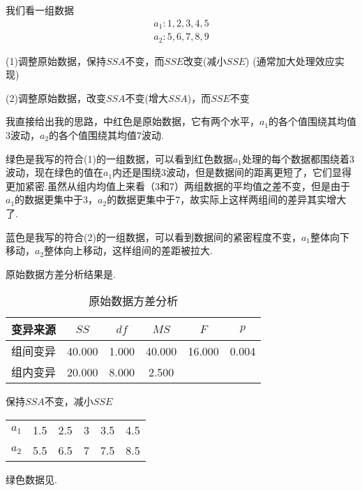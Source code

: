 我们看一组数据
\begin{align*}
    a_1:1, 2, 3, 4, 5\\
    a_2:5, 6, 7, 8, 9
\end{align*}

(1)调整原始数据，保持$SSA$不变，而$SSE$改变(减小$SSE$) (通常加大处理效应实现)

(2)调整原始数据，改变$SSA$不变(增大$SSA$)，而$SSE$不变

我直接给出我的思路，中红色是原始数据，它有两个水平，$a_1$的各个值围绕其均值3波动，$a_2$的各个值围绕其均值7波动.

绿色是我写的符合(1)的一组数据，可以看到红色数据$a_1$处理的每个数据都围绕着3波动，现在绿色的值在$a_1$内还是围绕3波动，但是数据间的距离更短了，它们显得更加紧密.虽然从组内均值上来看（3和7）两组数据的平均值之差不变，但是由于$a_1$的数据更集中于3，$a_2$的数据更集中于7，故实际上这样两组间的差异其实增大了.

蓝色是我写的符合(2)的一组数据，可以看到数据间的紧密程度不变，$a_1$整体向下移动，$a_2$整体向上移动，这样组间的差距被拉大.

原始数据方差分析结果是.

\begin{table}[h]
	\centering
	\caption{原始数据方差分析}
	{
		\begin{tabular}{cccccc}
			\toprule
			变异来源 & $SS$ & $df$ & $MS$ & $F$ & $p$  \\
			\midrule
			组间变异 & 40.000 & 1.000 & 40.000 & 16.000 & 0.004  \\
			组内变异 & 20.000 & 8.000 & 2.500 &  &    \\
			\bottomrule
		\end{tabular}
	}
\end{table}

\begin{margintable}
    \caption{保持$SSA$不变，减小$SSE$}
    \raggedright
    \begin{tabular}{cccccc}
        \hline
        $a_1$ & 1.5 & 2.5 & 3 & 3.5 & 4.5\\
        $a_2$ & 5.5 & 6.5 & 7 & 7.5 & 8.5\\
        \hline
    \end{tabular}
\end{margintable}

绿色数据见.


